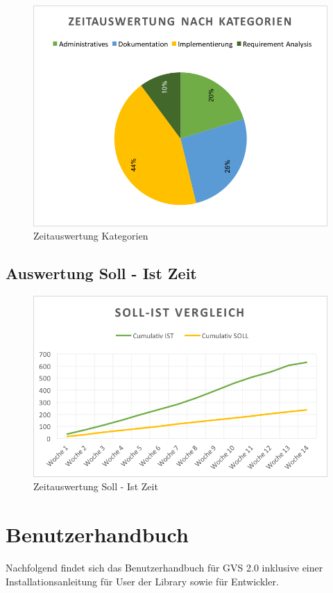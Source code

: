 \documentclass[11pt,a4paper,english,oneside]{book}
\numberwithin{equation}{chapter}
\begin{document}
	\clearpage

	\begin{figure}[h!]
		\centering
		\includegraphics[width=0.7\linewidth]{assets/images/zeitauswertung-kat-pie}
		\caption{Zeitauswertung Kategorien}
		\label{zeitauswertung-kategorien-pie}
	\end{figure}


	\section{Auswertung Soll - Ist Zeit}
	\begin{figure}[h!]
		\centering
		\includegraphics[width=0.7\linewidth]{assets/images/zeitauswertung-soll_ist}
		\caption{Zeitauswertung Soll - Ist Zeit}
		\label{zeitauswertung-soll_ist}
	\end{figure}
	
	\chapter{Benutzerhandbuch} \label{ch:manual}
	Nachfolgend findet sich das Benutzerhandbuch für GVS 2.0 inklusive einer Installationsanleitung für User der Library sowie für Entwickler.
	
		
	
\end{document}
